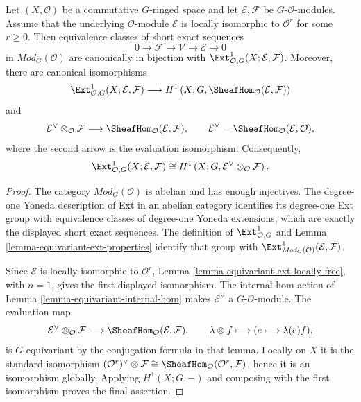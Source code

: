 \begin{lemma}
\label{lemma-equivariant-extension-classes-finite-locally-free}
\begin{reference}
\cite[Chapter V, \S 5.6, pp. 218--219]{Tohoku}
\end{reference}
Let $(X,\mathcal O)$ be a commutative $G$-ringed space and let
$\mathcal E,\mathcal F$ be $G$-$\mathcal O$-modules. Assume that the
underlying $\mathcal O$-module $\mathcal E$ is locally isomorphic to
$\mathcal O^r$ for some $r\geq 0$. Then equivalence classes of short exact
sequences
$$
0 \longrightarrow \mathcal F \longrightarrow \mathcal V
\longrightarrow \mathcal E \longrightarrow 0
$$
in $\textit{Mod}_G(\mathcal O)$ are canonically in bijection with
$\Ext^1_{\mathcal O,G}(X;\mathcal E,\mathcal F)$. Moreover, there are
canonical isomorphisms
$$
\Ext^1_{\mathcal O,G}(X;\mathcal E,\mathcal F)
\longrightarrow
H^1\left(X;G,\SheafHom_{\mathcal O}(\mathcal E,\mathcal F)\right)
$$
and
$$
\mathcal E^\vee\otimes_{\mathcal O}\mathcal F
\longrightarrow
\SheafHom_{\mathcal O}(\mathcal E,\mathcal F),
\qquad
\mathcal E^\vee=
\SheafHom_{\mathcal O}(\mathcal E,\mathcal O),
$$
where the second arrow is the evaluation isomorphism. Consequently,
$$
\Ext^1_{\mathcal O,G}(X;\mathcal E,\mathcal F)
\cong
H^1\left(X;G,\mathcal E^\vee\otimes_{\mathcal O}\mathcal F\right).
$$
\end{lemma}

\begin{proof}
The category $\textit{Mod}_G(\mathcal O)$ is abelian and has enough
injectives. The degree-one Yoneda description of Ext in an abelian
category identifies its degree-one Ext group with equivalence classes of
degree-one Yoneda extensions, which are exactly the displayed short exact sequences. The
definition of $\Ext^1_{\mathcal O,G}$ and Lemma
\ref{lemma-equivariant-ext-properties} identify that group with
$\Ext^1_{\textit{Mod}_G(\mathcal O)}(\mathcal E,\mathcal F)$.

\medskip\noindent
Since $\mathcal E$ is locally isomorphic to $\mathcal O^r$, Lemma
\ref{lemma-equivariant-ext-locally-free}, with $n=1$, gives the first
displayed isomorphism. The internal-hom action of Lemma
\ref{lemma-equivariant-internal-hom} makes
$\mathcal E^\vee$ a $G$-$\mathcal O$-module. The evaluation map
$$
\mathcal E^\vee\otimes_{\mathcal O}\mathcal F
\longrightarrow
\SheafHom_{\mathcal O}(\mathcal E,\mathcal F),
\qquad
\lambda\otimes f\longmapsto(e\longmapsto\lambda(e)f),
$$
is $G$-equivariant by the conjugation formula in that lemma. Locally on
$X$ it is the standard isomorphism
$(\mathcal O^r)^\vee\otimes\mathcal F\cong
\SheafHom_{\mathcal O}(\mathcal O^r,\mathcal F)$, hence it is an
isomorphism globally. Applying $H^1(X;G,-)$ and composing with the first
isomorphism proves the final assertion.
\end{proof}

